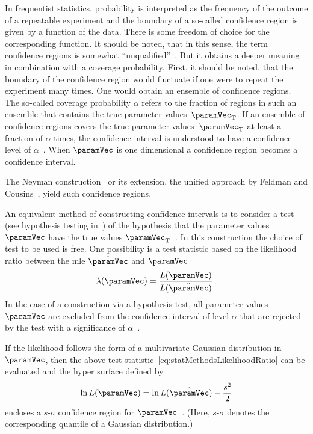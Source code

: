 In frequentist statistics, probability is interpreted as the frequency of the outcome of a repeatable experiment and the boundary of a so-called confidence region is given by a function of the data. There is some freedom of choice for the corresponding function. It should be noted, that in this sense, the term confidence regions is somewhat ``unqualified''~\cite{ReviewOfParticlePhysics}. But it obtains a deeper meaning in combination with a coverage probability. First, it should be noted, that the boundary of the confidence region would fluctuate if one were to repeat the experiment many times. One would obtain an ensemble of confidence regions. The so-called coverage probability $\alpha$ refers to the fraction of regions in such an ensemble that contains the true parameter values~$\paramVec_\mathrm{T}$\cite{ReviewOfParticlePhysics}. If an ensemble of confidence regions covers the true parameter values~$\paramVec_\mathrm{T}$ at least a fraction of $\alpha$ times, the confidence interval is understood to have a confidence level of $\alpha$~\cite{ReviewOfParticlePhysics}. When $\paramVec$ is one dimensional a confidence region becomes a confidence interval. 

The Neyman construction~\cite{Neyman1937} or its extension, the unified approach by Feldman and Cousins~\cite{Feldman1998}, yield such confidence regions.

An equivalent method of constructing confidence intervals is to consider a test (see hypothesis testing in~\cite{ReviewOfParticlePhysics}) of the hypothesis that the parameter values $\paramVec$ have the true values $\paramVec_\mathrm{T}$~\cite{ReviewOfParticlePhysics}. In this construction the choice of test to be used is free. One possibility is a test statistic based on the likelihood ratio between the \gls{mle} $\hat{\paramVec}$ and $\paramVec$~\cite{ReviewOfParticlePhysics}
\begin{equation}
	\label{eq:statMethodsLikelihoodRatio}
	\lambda(\paramVec) =
	\frac{L(\paramVec)}{L(\hat{\paramVec})}
	\fullstop
\end{equation}
In the case of a construction via a hypothesis test, all parameter values $\paramVec$ are excluded from the confidence interval of level $\alpha$ that are rejected by the test with a significance of $\alpha$~\cite{ReviewOfParticlePhysics}.

If the likelihood follows the form of a multivariate Gaussian distribution in $\paramVec$, then the above test statistic~\eqref{eq:statMethodsLikelihoodRatio} can be evaluated and the hyper surface defined by
\begin{equation}
	\label{eq:statMethodsConfidenceContour}
	\ln L(\paramVec) = 	\ln L(\hat{\paramVec}) - \frac{s^2}{2}
\end{equation}
encloses a $s$-$\sigma$ confidence region for $\paramVec$~\cite{ReviewOfParticlePhysics}. (Here, $s$-$\sigma$ denotes the corresponding quantile of a Gaussian distribution.) 

